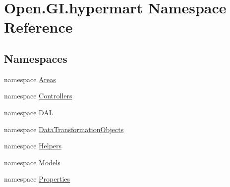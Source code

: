\hypertarget{namespace_open_1_1_g_i_1_1hypermart}{}\section{Open.\+G\+I.\+hypermart Namespace Reference}
\label{namespace_open_1_1_g_i_1_1hypermart}
\subsection*{Namespaces}
\begin{DoxyCompactItemize}
\item 
namespace \hyperlink{namespace_open_1_1_g_i_1_1hypermart_1_1_areas}{Areas}
\item 
namespace \hyperlink{namespace_open_1_1_g_i_1_1hypermart_1_1_controllers}{Controllers}
\item 
namespace \hyperlink{namespace_open_1_1_g_i_1_1hypermart_1_1_d_a_l}{D\+A\+L}
\item 
namespace \hyperlink{namespace_open_1_1_g_i_1_1hypermart_1_1_data_transformation_objects}{Data\+Transformation\+Objects}
\item 
namespace \hyperlink{namespace_open_1_1_g_i_1_1hypermart_1_1_helpers}{Helpers}
\item 
namespace \hyperlink{namespace_open_1_1_g_i_1_1hypermart_1_1_models}{Models}
\item 
namespace \hyperlink{namespace_open_1_1_g_i_1_1hypermart_1_1_properties}{Properties}
\end{DoxyCompactItemize}
